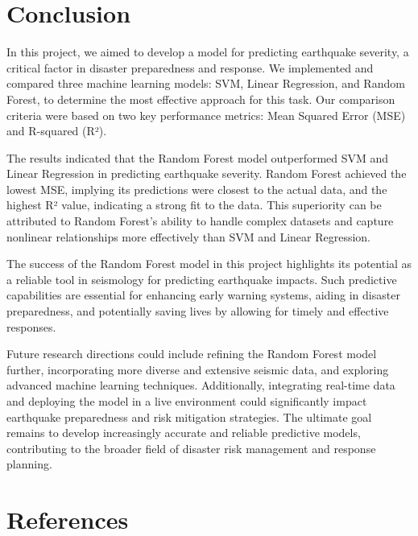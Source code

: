 \documentclass{article}
\begin{document}
\section{Conclusion}
In this project, we aimed to develop a model for predicting earthquake severity, a critical factor in disaster preparedness and response. We implemented and compared three machine learning models: SVM, Linear Regression, and Random Forest, to determine the most effective approach for this task. Our comparison criteria were based on two key performance metrics: Mean Squared Error (MSE) and R-squared (R²).

The results indicated that the Random Forest model outperformed SVM and Linear Regression in predicting earthquake severity. Random Forest achieved the lowest MSE, implying its predictions were closest to the actual data, and the highest R² value, indicating a strong fit to the data. This superiority can be attributed to Random Forest's ability to handle complex datasets and capture nonlinear relationships more effectively than SVM and Linear Regression.

The success of the Random Forest model in this project highlights its potential as a reliable tool in seismology for predicting earthquake impacts. Such predictive capabilities are essential for enhancing early warning systems, aiding in disaster preparedness, and potentially saving lives by allowing for timely and effective responses.

Future research directions could include refining the Random Forest model further, incorporating more diverse and extensive seismic data, and exploring advanced machine learning techniques. Additionally, integrating real-time data and deploying the model in a live environment could significantly impact earthquake preparedness and risk mitigation strategies. The ultimate goal remains to develop increasingly accurate and reliable predictive models, contributing to the broader field of disaster risk management and response planning.



\section*{References}



\medskip
\end{document}

